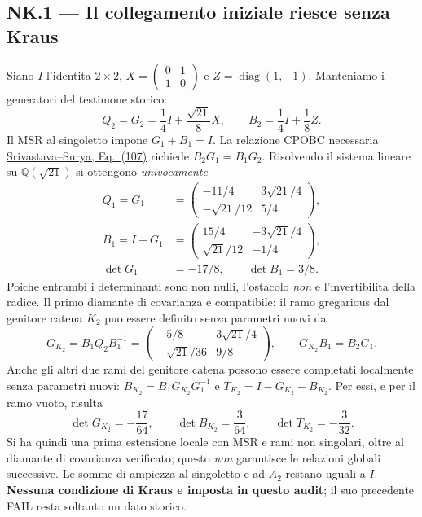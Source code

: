 \documentclass[11pt,a4paper]{article}
\begin{document}
\subsection*{NK.1 --- Il collegamento iniziale riesce senza Kraus}
Siano $I$ l'identita $2\times2$, $X=\left(\begin{smallmatrix}0&1\\1&0\end{smallmatrix}\right)$ e $Z=\operatorname{diag}(1,-1)$. Manteniamo i generatori del testimone storico:
\begin{equation}
Q_2=G_2=\frac14 I+\frac{\sqrt{21}}8X,\qquad B_2=\frac14 I+\frac18 Z.
\tag{NK.1}
\end{equation}
Il MSR al singoletto impone $G_1+B_1=I$. La relazione CPOBC necessaria \href{https://arxiv.org/html/2603.25503}{Srivastava--Surya, Eq.~(107)} richiede $B_2G_1=B_1G_2$. Risolvendo il sistema lineare su $\mathbb Q(\sqrt{21})$ si ottengono \emph{univocamente}
\begin{equation}
\begin{aligned}
Q_1=G_1&=\begin{pmatrix}-11/4&3\sqrt{21}/4\\-\sqrt{21}/12&5/4\end{pmatrix},\\
B_1=I-G_1&=\begin{pmatrix}15/4&-3\sqrt{21}/4\\\sqrt{21}/12&-1/4\end{pmatrix},\\
\det G_1&=-17/8,\qquad \det B_1=3/8.
\end{aligned}\tag{NK.2}
\end{equation}
Poiche entrambi i determinanti sono non nulli, l'ostacolo \emph{non} e l'invertibilita della radice. Il primo diamante di covarianza e compatibile: il ramo gregarious dal genitore catena $K_2$ puo essere definito senza parametri nuovi da
\begin{equation}
G_{K_2}=B_1Q_2B_1^{-1}
=\begin{pmatrix}-5/8&3\sqrt{21}/4\\-\sqrt{21}/36&9/8\end{pmatrix},\qquad
G_{K_2}B_1=B_2G_1.
\tag{NK.3}
\end{equation}
Anche gli altri due rami del genitore catena possono essere completati localmente senza parametri nuovi: $B_{K_2}=B_1G_{K_2}G_1^{-1}$ e $T_{K_2}=I-G_{K_2}-B_{K_2}$. Per essi, e per il ramo vuoto, risulta
\begin{equation}
\det G_{K_2}=-\frac{17}{64},\qquad \det B_{K_2}=\frac3{64},\qquad
\det T_{K_2}=-\frac3{32}.\tag{NK.3a}
\end{equation}
Si ha quindi una prima estensione locale con MSR e rami non singolari, oltre al diamante di covarianza verificato; questo \emph{non} garantisce le relazioni globali successive. Le somme di ampiezza al singoletto e ad $A_2$ restano uguali a $I$. \textbf{Nessuna condizione di Kraus e imposta in questo audit}; il suo precedente FAIL resta soltanto un dato storico.
\end{document}

